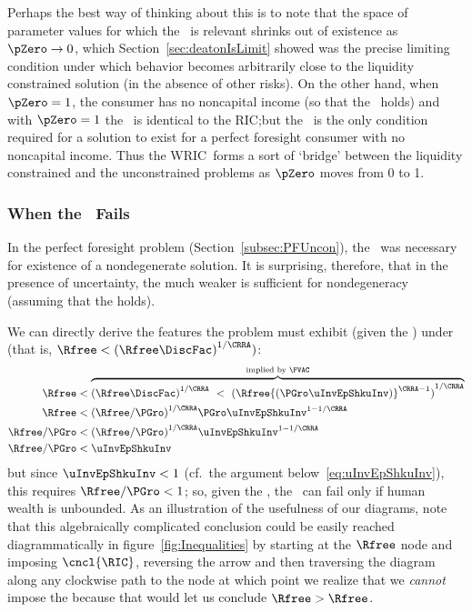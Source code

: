 \documentclass[ProjectDLO]{subfiles}
\begin{document}
Perhaps the best way of thinking about this is to note that the space of parameter values for which the \WRIC~is relevant shrinks out of existence as $\pZero \rightarrow 0$, which Section~\ref{sec:deatonIsLimit} showed was the precise limiting condition under which behavior becomes arbitrarily close to the liquidity constrained solution (in the absence of other risks).  On the other hand, when $\pZero = 1$, the consumer has no noncapital income (so that the \FHWC~holds) and with $\pZero=1$ the \WRIC~is identical to the RIC;\@ but the \RIC~is the only condition required for a solution to exist for a perfect foresight consumer with no noncapital income.  Thus the WRIC~forms a sort of `bridge' between the liquidity constrained and the unconstrained problems as $\pZero$ moves from 0 to 1.

\hypertarget{IntuitionRIC}{}
\subsubsection{When the \RIC~Fails}\label{subsubsec:WhenTheRICFails}

In the perfect foresight problem (Section~\ref{subsec:PFUncon}), the \RIC~was necessary for existence of a nondegenerate solution.  It is surprising, therefore, that in the presence of uncertainty, the much weaker {\WRIC} is sufficient for nondegeneracy (assuming that the {\FVAC} holds).
\begin{comment}
  But if the \RIC~does hold, some useful results can be derived.  Arguably
  the most fundamental are that the limiting values
  for the minimal and maximal marginal propensities to consume implicit in
 ~\eqref{eq:MaxMPCInv} and~\eqref{eq:MinMPCInv} are positive and finite.
\end{comment}
We can directly derive the features the problem must
exhibit (given the \FVAC) under \cncl{\RIC} (that is, $\Rfree < {(\Rfree \DiscFac)}^{1/\CRRA})$:
\begin{align}
  \Rfree   & < \overbrace{{(\Rfree \DiscFac)}^{1/\CRRA} ~ < ~ {(\Rfree {(\PGro \uInvEpShkuInv)}^{\CRRA-1})}^{1/\CRRA}}^{\text{implied by \FVAC}} \notag
  \\  \Rfree   & < {(\Rfree/\PGro)}^{1/\CRRA}\PGro \uInvEpShkuInv^{1-1/\CRRA} \notag
  \\  \Rfree/\PGro  & < {(\Rfree/\PGro)}^{1/\CRRA}\uInvEpShkuInv^{1-1/\CRRA} \notag
  \\  \Rfree/\PGro  & < \uInvEpShkuInv \label{eq:RICimplies}
\end{align}
but since $\uInvEpShkuInv < 1$ (cf.\ the argument below~\eqref{eq:uInvEpShkuInv}), this requires $\Rfree/\PGro < 1$; so, given the \FVAC, the \RIC~can fail only if human wealth is unbounded.  As an illustration of the usefulness of our diagrams, note that this algebraically complicated conclusion could be easily reached diagrammatically in figure~\ref{fig:Inequalities} by starting at the $\Rfree$ node and imposing $\cncl{\RIC}$, reversing the {\RIC} arrow and then traversing the diagram along any clockwise path to the {\PFVAF} node at which point we realize that we \textit{cannot} impose the {\FHWC} because that would let us conclude $\Rfree > \Rfree$.
\end{document}
